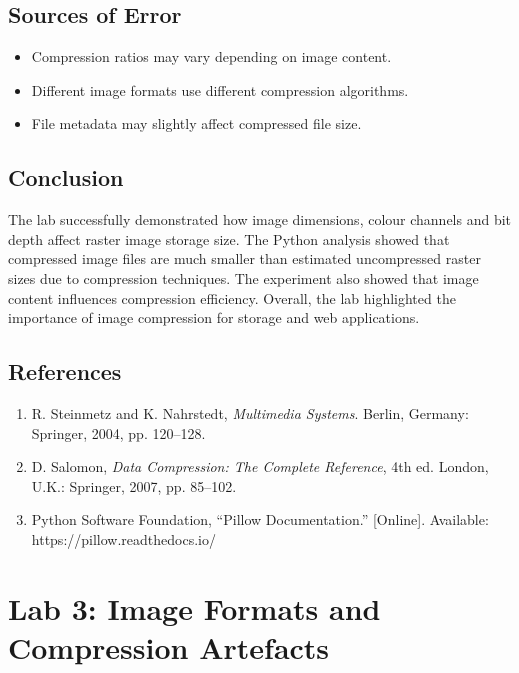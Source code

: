 \documentclass[12pt,a4paper]{article}
\begin{document}
\subsection{Sources of Error}

\begin{itemize}
    \item Compression ratios may vary depending on image content.
    
    \item Different image formats use different compression algorithms.
    
    \item File metadata may slightly affect compressed file size.
\end{itemize}

\subsection{Conclusion}

The lab successfully demonstrated how image dimensions, colour channels and bit depth affect raster image storage size. The Python analysis showed that compressed image files are much smaller than estimated uncompressed raster sizes due to compression techniques. The experiment also showed that image content influences compression efficiency. Overall, the lab highlighted the importance of image compression for storage and web applications.

\subsection{References}

\begin{enumerate}
    \item R. Steinmetz and K. Nahrstedt, \textit{Multimedia Systems}. Berlin, Germany: Springer, 2004, pp. 120--128.
    
    \item D. Salomon, \textit{Data Compression: The Complete Reference}, 4th ed. London, U.K.: Springer, 2007, pp. 85--102.
    
    \item Python Software Foundation, ``Pillow Documentation.'' [Online]. Available: https://pillow.readthedocs.io/
\end{enumerate}
\newpage


\section{Lab 3: Image Formats and Compression Artefacts}
\end{document}

